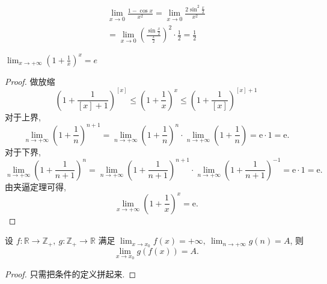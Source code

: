 \begin{example}
    \begin{gather}
        \lim_{x \to 0} \frac{1-\cos x}{x^{2}} = \lim_{x \to 0} \frac{2 \sin ^{2} \frac{x}{2}}{x^{2}} 
        \\
        = \lim_{x \to 0} \left( \frac{\sin \frac{x}{2}}{\frac{x}{2}} \right) ^{2} \cdot \frac{1}{2} = \frac{1}{2}
    \end{gather}
\end{example}

\begin{proposition}[Euler]
    $\displaystyle 
    \lim_{x \to +\infty} \left( 1 + \frac{1}{x} \right) ^{x} = e
    $
\end{proposition}

\begin{proof}
    做放缩
    \begin{equation}
      \left( 1 + \frac{1}{[x] + 1} \right) ^{[x]} \le \left( 1 + \frac{1}{x} \right) ^{x} \le \left( 1 + \frac{1}{[x]} \right) ^{[x] + 1}
    \end{equation}
    对于上界, 
    \begin{equation}
       \lim_{n \to +\infty} \left( 1 + \frac{1}{n} \right) ^{n+1} = \lim_{n \to +\infty} \left( 1 + \frac{1}{n} \right) ^{n} \cdot \lim_{n \to +\infty} \left( 1 + \frac{1}{n} \right) = \mathrm{e} \cdot 1 = \mathrm{e}.
    \end{equation}
    对于下界,
    \begin{equation}
      \lim_{n \to +\infty} \left( 1 + \frac{1}{n+1} \right) ^{n} = \lim_{n \to +\infty} \left( 1 + \frac{1}{n+1} \right) ^{n+1} \cdot \lim_{n \to +\infty} \left( 1 + \frac{1}{n+1} \right) ^{-1} = \mathrm{e} \cdot 1 = \mathrm{e}.
    \end{equation}
    由夹逼定理可得,
    \begin{equation}
      \lim_{x \to +\infty} \left( 1 + \frac{1}{x} \right) ^{x} = \mathrm{e}.
    \end{equation}
\end{proof}

\begin{proposition}
    设 $f\colon \mathbb{R} \to \mathbb{Z}_{+},\ g\colon \mathbb{Z}_{+} \to \mathbb{R}$ 满足 $\displaystyle \lim_{x \to x_0} f\left( x \right) = + \infty,\ \lim_{n \to +\infty} g\left( n \right)  = A$, 则
    \begin{equation}
        \lim_{x \to x_0} g \left( f \left( x \right)  \right) = A.
    \end{equation}
\end{proposition}
\begin{proof}
    只需把条件的定义拼起来.
\end{proof}

